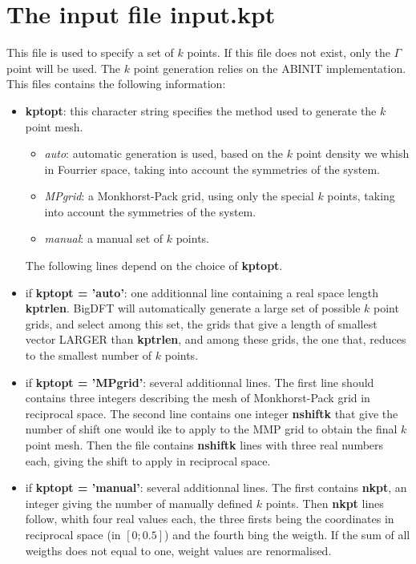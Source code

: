 \documentclass[a4paper,11pt]{report}
\begin{document}
\section{The input file input.kpt}
This file is used to specify a set of $k$ points. If this file does not exist, only the $\Gamma$ point will be used. The $k$ point generation relies on the ABINIT implementation. This files contains the following information:
\begin{itemize}
  \item  \textbf{kptopt}: this character string specifies the method used to generate the $k$ point mesh.
       \begin{itemize}
       \item  \emph{auto}: automatic generation is used, based on the $k$ point density we whish in Fourrier space, taking into account the symmetries of the system.
       \item  \emph{MPgrid}: a Monkhorst-Pack grid, using only the special $k$ points, taking into account the symmetries of the system.
       \item  \emph{manual}: a manual set of $k$ points.
       \end{itemize}
       The following lines depend on the choice of \textbf{kptopt}.
  \item  if \textbf{kptopt = 'auto'}: one additionnal line containing a real space length \textbf{kptrlen}. BigDFT will automatically generate a large set of possible $k$ point grids, and select among this set, the grids that give a length of smallest vector LARGER than \textbf{kptrlen}, and among these grids, the one that, reduces to the smallest number of $k$ points.
  \item  if \textbf{kptopt = 'MPgrid'}: several additionnal lines. The first line should contains three integers describing the mesh of Monkhorst-Pack grid in reciprocal space. The second line contains one integer \textbf{nshiftk} that give the number of shift one would ike to apply to the MMP grid to obtain the final $k$ point mesh. Then the file contains \textbf{nshiftk} lines with three real numbers each, giving the shift to apply in reciprocal space.
  \item  if \textbf{kptopt = 'manual'}: several additionnal lines. The first contains \textbf{nkpt}, an integer giving the number of manually defined $k$ points. Then \textbf{nkpt} lines follow, whith four real values each, the three firsts being the coordinates in reciprocal space (in $[0;0.5]$) and the fourth bing the weigth. If the sum of all weigths does not equal to one, weight values are renormalised.
\end{itemize}
\end{document}
